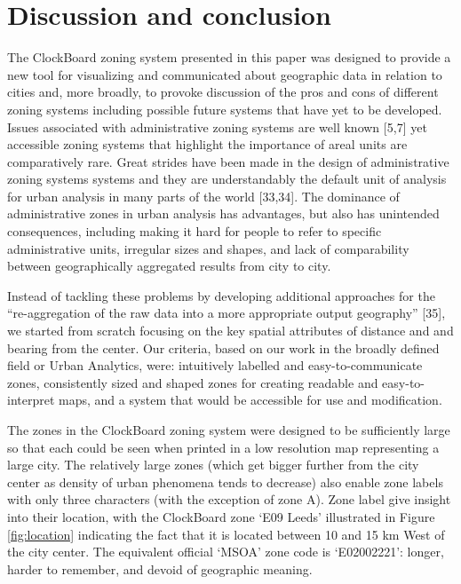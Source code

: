 \documentclass{josis}
\begin{document}
\hypertarget{discussion}{%
\section{Discussion and conclusion}\label{discussion}}

The ClockBoard zoning system presented in this paper was designed to provide a new tool for visualizing and communicated about geographic data in relation to cities and, more broadly, to provoke discussion of the pros and cons of different zoning systems including possible future systems that have yet to be developed.
Issues associated with administrative zoning systems are well known {[}5,7{]} yet accessible zoning systems that highlight the importance of areal units are comparatively rare.
Great strides have been made in the design of administrative zoning systems systems and they are understandably the default unit of analysis for urban analysis in many parts of the world {[}33,34{]}.
The dominance of administrative zones in urban analysis has advantages, but also has unintended consequences, including making it hard for people to refer to specific administrative units, irregular sizes and shapes, and lack of comparability between geographically aggregated results from city to city.

Instead of tackling these problems by developing additional approaches for the ``re-aggregation of the raw data into a more
appropriate output geography'' {[}35{]}, we started from scratch focusing on the key spatial attributes of distance and and bearing from the center.
Our criteria, based on our work in the broadly defined field or Urban Analytics, were: intuitively labelled and easy-to-communicate zones, consistently sized and shaped zones for creating readable and easy-to-interpret maps, and a system that would be accessible for use and modification.

The zones in the ClockBoard zoning system were designed to be sufficiently large so that each could be seen when printed in a low resolution map representing a large city.
The relatively large zones (which get bigger further from the city center as density of urban phenomena tends to decrease) also enable zone labels with only three characters (with the exception of zone A).
Zone label give insight into their location, with the ClockBoard zone `E09 Leeds' illustrated in Figure \ref{fig:location} indicating the fact that it is located between 10 and 15 km West of the city center.
The equivalent official `MSOA' zone code is `E02002221': longer, harder to remember, and devoid of geographic meaning.
\end{document}
